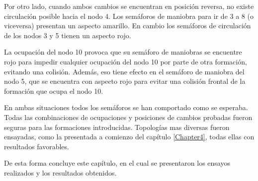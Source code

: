 	Por otro lado, cuando ambos cambios se encuentran en posición reversa, no existe circulación posible hacia el nodo 4. Los semáforos de maniobra para ir de 3 a 8 (o viceversa) presentan un aspecto amarillo. En cambio los semáforos de circulación de los nodos 3 y 5 tienen un aspecto rojo.
	
	La ocupación del nodo 10 provoca que su semáforo de maniobras se encuentre rojo para impedir cualquier ocupación del nodo 10 por parte de otra formación, evitando una colisión. Además, eso tiene efecto en el semáforo de maniobra del nodo 5, que se encuentra con aspecto rojo para evitar una colisión frontal de la formación que ocupa el nodo 10.
	
	En ambas situaciones todos los semáforos se han comportado como se esperaba. Todas las combinaciones de ocupaciones y posiciones de cambios probadas fueron seguras para las formaciones introducidas. Topologías mas diversas fueron ensayadas, como la presentada a comienzo del capítulo \ref{Chapter4}, todas ellas con resultados favorables.
	
	De esta forma concluye este capítulo, en el cual se presentaron los ensayos realizados y los resultados obtenidos.
